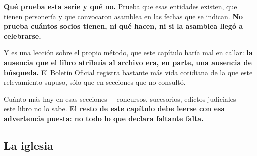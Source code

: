 \begin{cautela}
\textbf{Qué prueba esta serie y qué no.} Prueba que esas entidades existen, que tienen
personería y que convocaron asamblea en las fechas que se indican. \textbf{No prueba cuántos
socios tienen, ni qué hacen, ni si la asamblea llegó a celebrarse.}

Y es una lección sobre el propio método, que este capítulo haría mal en callar: \textbf{la
ausencia que el libro atribuía al archivo era, en parte, una ausencia de búsqueda.} El Boletín
Oficial registra bastante más vida cotidiana de la que este relevamiento supuso, sólo que en
secciones que no consultó.

Cuánto más hay en esas secciones ---concursos, sucesorios, edictos judiciales--- este libro no
lo sabe. \textbf{El resto de este capítulo debe leerse con esa advertencia puesta: no todo lo
que declara faltante falta.}
\end{cautela}

\subsection*{La iglesia}

